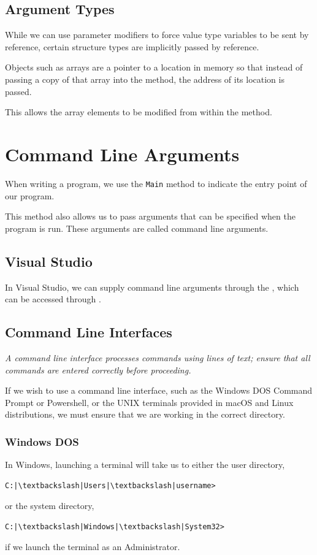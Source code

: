 \documentclass{article}
\begin{document}
\subsection{Argument Types}
While we can use parameter modifiers to force value type variables to
be sent by reference, certain structure types are implicitly passed by
reference.

Objects such as arrays are a pointer to a location in memory so that
instead of passing a copy of that array into the method, the address of
its location is passed.

This allows the array elements to be modified from within the method.
\section{Command Line Arguments}
When writing a program, we use the \texttt{Main} method to
indicate the entry point of our program.

This method also allows us to pass arguments that can be specified when
the program is run. These arguments are called command line arguments.
\subsection{Visual Studio}
In Visual Studio, we can supply command line arguments through the
, which can be accessed through
.
\subsection{Command Line Interfaces}
\emph{A command line interface processes commands using lines of text;
    ensure that all commands are entered correctly before proceeding.}

If we wish to use a command line interface, such as the Windows DOS
Command Prompt or Powershell, or the UNIX terminals provided in macOS
and Linux distributions, we must ensure that we are working in the
correct directory.
\subsubsection{Windows DOS}
In Windows, launching a terminal will take us to either the user
directory,
\begin{verbatim}
C:|\textbackslash|Users|\textbackslash|username>
\end{verbatim}
or the system directory,
\begin{verbatim}
C:|\textbackslash|Windows|\textbackslash|System32>
\end{verbatim}
if we launch the terminal as an Administrator.
\end{document}
